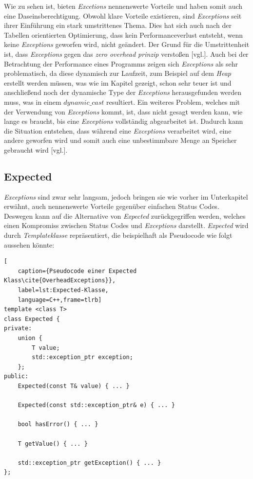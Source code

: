 Wie zu sehen ist, bieten \emph{Excetions} nennenswerte Vorteile und haben somit auch eine
Daseinsberechtigung.
\newline
\newline
Obwohl klare Vorteile existieren, sind \emph{Exceptions} seit ihrer Einführung ein stark
umstrittenes Thema. Dies hat sich auch nach der Tabellen orientierten Optimierung, dass kein
Performanceverlust entsteht, wenn keine \emph{Exceptions} geworfen wird, nicht geändert. Der
Grund für die Umstrittenheit ist, dass \emph{Exceptions} gegen das \emph{zero overhead prinzip}
verstoßen \cite{Exception1998}[vgl.]. Auch bei der Betrachtung der Performance eines Programms
zeigen sich \emph{Exceptions} als sehr problematisch, da diese dynamisch zur Laufzeit, zum
Beispiel auf dem \emph{Heap}
erstellt werden müssen, was wie im Kapitel \emph{} gezeigt, schon sehr
teuer ist und
anschließend noch der dynamische Type der \emph{Exceptions} herausgefunden werden muss, was in
einem \emph{$dynamic\_cast$} resultiert. Ein weiteres Problem, welches mit der Verwendung von
\emph{Exceptions} kommt, ist, dass nicht gesagt werden kann, wie lange es braucht, bis eine
\emph{Exceptions} vollständig abgearbeitet ist. Dadurch kann die Situation entstehen, dass
während eine \emph{Exceptions} verarbeitet wird, eine andere geworfen wird und somit auch eine
unbestimmbare Menge an Speicher gebraucht wird \cite{HandsOn}[vgl.].

\subsection{Expected}
\emph{Exceptions} sind zwar sehr langsam, jedoch bringen sie wie vorher im Unterkapitel
\emph{} erwähnt, auch nennenswerte Vorteile gegenüber einfachen Status
Codes. Deswegen
kann auf die Alternative von \emph{Expected} zurückgegriffen werden, welches einen Kompromiss
zwischen Status Codes und \emph{Exceptions} darstellt. \emph{Expected} wird durch
\emph{Templateklasse} repräsentiert, die beispielhaft als Pseudocode wie folgt aussehen könnte:

\begin{lstlisting}[
    caption={Pseudocode einer Expected Klass\cite{OverheadExceptions}},
    label=lst:Expected-Klasse,
    language=C++,frame=tlrb]
template <class T>
class Expected {
private:
    union {
        T value;
        std::exception_ptr exception;
    };
public:
    Expected(const T& value) { ... }
    
    Expected(const std::exception_ptr& e) { ... }
    
    bool hasError() { ... }
    
    T getValue() { ... }
    
    std::exception_ptr getException() { ... }
};
\end{lstlisting}

